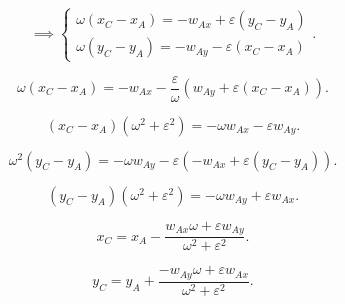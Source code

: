 \documentclass[a4paper,12pt]{report}
\begin{document}
\begin{enumerate}
\[
\implies
\begin{cases}
  \omega (x_C - x_A) = -w_{Ax} + \varepsilon(y_C - y_A) \\
  \omega (y_C - y_A) = -w_{Ay} - \varepsilon(x_C - x_A)
\end{cases}
.\] 

\[
  \omega (x_C - x_A) = -w_{Ax} - \frac{\varepsilon}{\omega}
  (w_{Ay} + \varepsilon(x_C - x_A))
.\] 

\[
  (x_C - x_A)\left( \omega^2 + \varepsilon^2 \right) =
  -\omega w_{Ax} - \varepsilon w_{Ay}
.\] 

\[
  \omega^2 (y_C - y_A) = -\omega w_{Ay} - \varepsilon
  (-w_{Ax} + \varepsilon (y_C - y_A))
.\] 

\[
  (y_C - y_A) \left( \omega^2 + \varepsilon^2 \right)  = -\omega w_{Ay} + \varepsilon w_{Ax}
.\] 

\[
\boxed{x_C = x_A - \frac{w_{Ax} \omega + \varepsilon w_{Ay}}{\omega^2 + \varepsilon^2} }
.\] 

\[
  \boxed{ y_C = y_A + \frac{-w_{Ay} \omega + \varepsilon w_{Ax}}{\omega^2 + \varepsilon^2}}
.\] 

\end{enumerate}
\end{document}
